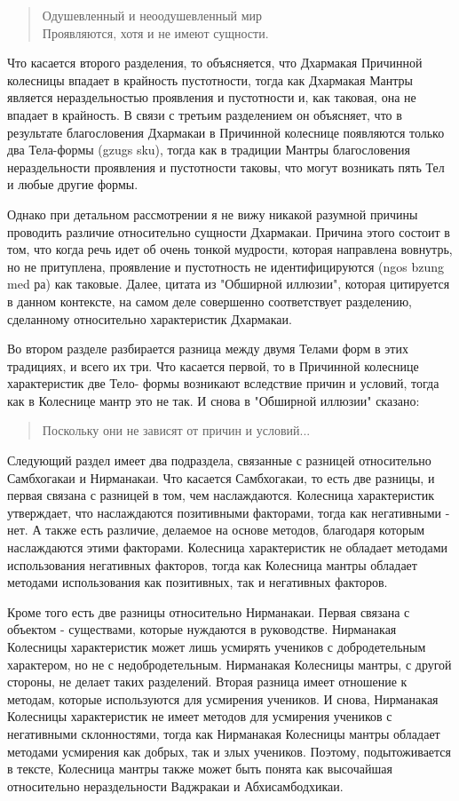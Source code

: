 \begin{verse}
Одушевленный и неоодушевленный мир\\
Проявляются, хотя и не имеют сущности.
\end{verse}

Что касается второго разделения, то объясняется, что Дхармакая Причинной
колесницы впадает в крайность пустотности, тогда как Дхармакая Мантры является
нераздельностью проявления и пустотности и, как таковая, она не впадает в крайность. В
связи с третьим разделением он объясняет, что в результате благословения Дхармакаи в
Причинной колеснице появляются только два Тела-формы (gzugs sku), тогда как в традиции
Мантры благословения нераздельности проявления и пустотности таковы, что могут
возникать пять Тел и любые другие формы.

Однако при детальном рассмотрении я не вижу никакой разумной причины проводить
различие относительно сущности Дхармакаи. Причина этого состоит в том, что когда речь
идет об очень тонкой мудрости, которая направлена вовнутрь, но не притуплена, проявление
и пустотность не идентифицируются (ngos bzung med ра) как таковые. Далее, цитата из
"Обширной иллюзии", которая цитируется в данном контексте, на самом деле совершенно
соответствует разделению, сделанному относительно характеристик Дхармакаи.

Во втором разделе разбирается разница между двумя Телами форм в этих традициях,
и всего их три. Что касается первой, то в Причинной колеснице характеристик две Тело-
формы возникают вследствие причин и условий, тогда как в Колеснице мантр это не так. И
снова в "Обширной иллюзии" сказано:

\begin{verse}
Поскольку они не зависят от причин и условий...
\end{verse}

Следующий раздел имеет два подраздела, связанные с разницей относительно
Самбхогакаи и Нирманакаи. Что касается Самбхогакаи, то есть две разницы, и первая
связана с разницей в том, чем наслаждаются. Колесница характеристик утверждает, что
наслаждаются позитивными факторами, тогда как негативными - нет. А также есть различие,
делаемое на основе методов, благодаря которым наслаждаются этими факторами. Колесница
характеристик не обладает методами использования негативных факторов, тогда как
Колесница мантры обладает методами использования как позитивных, так и негативных
факторов.

Кроме того есть две разницы относительно Нирманакаи. Первая связана с объектом -
существами, которые нуждаются в руководстве. Нирманакая Колесницы характеристик
может лишь усмирять учеников с добродетельным характером, но не с недобродетельным.
Нирманакая Колесницы мантры, с другой стороны, не делает таких разделений. Вторая
разница имеет отношение к методам, которые используются для усмирения учеников. И
снова, Нирманакая Колесницы характеристик не имеет методов для усмирения учеников с
негативными склонностями, тогда как Нирманакая Колесницы мантры обладает методами
усмирения как добрых, так и злых учеников. Поэтому, подытоживается в тексте, Колесница
мантры также может быть понята как высочайшая относительно нераздельности Ваджракаи
и Абхисамбодхикаи.\\

